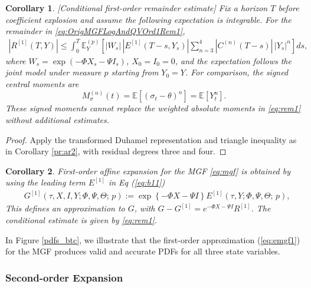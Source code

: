 \documentclass[11pt,a4paper] {article}
\newtheorem{corollary}{Corollary}[section]
\begin{document}
\begin{corollary}\label{pr:ar1}[Conditional first-order remainder estimate]
Fix a horizon $T$ before coefficient explosion and assume the following
expectation is integrable. For the remainder in
\eqref{eq:OrigMGFLogAndQVOrd1Rem1},
\begin{equation}\label{eq:rem1}
\begin{split}
|R^{[1]}(T,Y)|\leq \int_0^T\mathbb E_Y^{(p)}\!\left[
  |W_s|\,|E^{[1]}(T-s,Y_s)|
  \sum_{n=3}^4|C^{(n)}(T-s)|\,|Y_s|^n\right]ds,
\end{split}
\end{equation}
where $W_s=\exp(-\Phi X_s-\Psi I_s)$, $X_0=I_0=0$, and
the expectation follows the joint model under measure $p$ starting from $Y_0=Y$.
For comparison, the signed central moments are
\begin{equation}\label{eq:central_mom_vol}
M^{(n)}_{\sigma}(t)=\mathbb E[(\sigma_t-\theta)^n]=\mathbb E[Y_t^n].
\end{equation}
These signed moments cannot replace the weighted absolute moments in
\eqref{eq:rem1} without additional estimates.
\end{corollary}
\begin{proof}
Apply the transformed Duhamel representation and triangle inequality as in
Corollary \ref{pr:ar2}, with residual degrees three and four.
\end{proof}



\begin{corollary} \label {pr:emgf1} First-order affine expansion for the MGF \eqref{eq:mgf} is obtained by using the leading term $E^{[1]}$ in Eq (\ref{eq:b11})
\begin{equation}\label{eq:emgf1}
\begin{split}
& G^{[1]}(\tau,X,I,Y; \Phi,\Psi,\Theta;\,p) := \exp \left\{-\Phi X-\Psi I \right\}  E^{[1]}(\tau,Y; \Phi,\Psi,\Theta;\,p),
\end{split}
\end{equation}
This defines an approximation to $G$, with $G-G^{[1]}=e^{-\Phi X-\Psi I}R^{[1]}$. The conditional estimate is given by \eqref{eq:rem1}.
\end{corollary}

In Figure \ref{pdfs_btc}, we illustrate that the first-order approximation (\ref{eq:emgf1}) for the MGF produces valid and accurate PDFs for all three state variables.



\subsubsection{Second-order Expansion}
 
\end{document}
